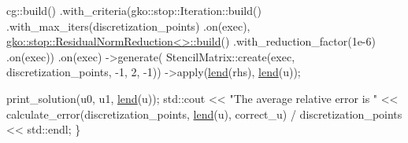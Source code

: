 \begin{DoxyCodeInclude}
    cg::build()
        .with\_criteria(gko::stop::Iteration::build()
                           .with\_max\_iters(discretization\_points)
                           .on(exec),
                       \hyperlink{classgko_1_1stop_1_1ResidualNormReduction}{gko::stop::ResidualNormReduction<>::build}()
                           .with\_reduction\_factor(1e-6)
                           .on(exec))
        .on(exec)
        ->generate(
            StencilMatrix::create(exec, discretization\_points, -1, 2, -1))
        ->apply(\hyperlink{namespacegko_aa8cb4876b72e5e1036ea9575443c439b}{lend}(rhs), \hyperlink{namespacegko_aa8cb4876b72e5e1036ea9575443c439b}{lend}(u));

    print\_solution(u0, u1, \hyperlink{namespacegko_aa8cb4876b72e5e1036ea9575443c439b}{lend}(u));
    std::cout << \textcolor{stringliteral}{"The average relative error is "}
              << calculate\_error(discretization\_points, \hyperlink{namespacegko_aa8cb4876b72e5e1036ea9575443c439b}{lend}(u), correct\_u) /
                     discretization\_points
              << std::endl;
\}
\end{DoxyCodeInclude}
 